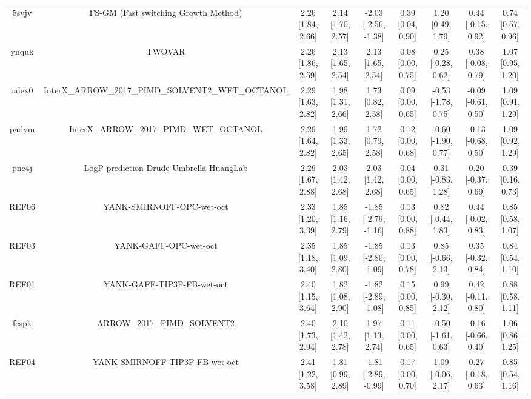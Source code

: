 \documentclass{article}
\begin{document}
\begin{center}
\begin{longtable}{|ccccccccc|}
 5svjv &               FS-GM (Fast switching Growth Method) &  2.26 [1.84, 2.66] &  2.14 [1.70, 2.57] &  -2.03 [-2.56, -1.38] &  0.39 [0.04, 0.90] &    1.20 [0.49, 1.79] &   0.44 [-0.15, 0.92] &     0.74 [0.57, 0.96] \\
 ynquk &                                             TWOVAR &  2.26 [1.86, 2.59] &  2.13 [1.65, 2.54] &     2.13 [1.65, 2.54] &  0.08 [0.00, 0.75] &   0.25 [-0.28, 0.62] &   0.38 [-0.08, 0.79] &     1.07 [0.95, 1.20] \\
 odex0 &  InterX\_ARROW\_2017\_PIMD\_SOLVENT2\_WET\_OCTANOL &  2.29 [1.63, 2.82] &  1.98 [1.31, 2.66] &     1.73 [0.82, 2.58] &  0.09 [0.00, 0.65] &  -0.53 [-1.78, 0.75] &  -0.09 [-0.61, 0.50] &     1.09 [0.91, 1.29] \\
 padym &            InterX\_ARROW\_2017\_PIMD\_WET\_OCTANOL &  2.29 [1.64, 2.82] &  1.99 [1.33, 2.65] &     1.72 [0.79, 2.58] &  0.12 [0.00, 0.68] &  -0.60 [-1.90, 0.77] &  -0.13 [-0.68, 0.50] &     1.09 [0.92, 1.29] \\
 pnc4j &            LogP-prediction-Drude-Umbrella-HuangLab &  2.29 [1.67, 2.88] &  2.03 [1.42, 2.68] &     2.03 [1.42, 2.68] &  0.04 [0.00, 0.65] &   0.31 [-0.83, 1.28] &   0.20 [-0.37, 0.69] &     0.39 [0.16, 0.73] \\
 REF06 &                          YANK-SMIRNOFF-OPC-wet-oct &  2.33 [1.20, 3.39] &  1.85 [1.16, 2.79] &  -1.85 [-2.79, -1.16] &  0.13 [0.00, 0.88] &   0.82 [-0.44, 1.83] &   0.44 [-0.02, 0.83] &     0.85 [0.58, 1.07] \\
 REF03 &                              YANK-GAFF-OPC-wet-oct &  2.35 [1.18, 3.40] &  1.85 [1.09, 2.80] &  -1.85 [-2.80, -1.09] &  0.13 [0.00, 0.78] &   0.85 [-0.66, 2.13] &   0.35 [-0.32, 0.84] &     0.84 [0.54, 1.10] \\
 REF01 &                         YANK-GAFF-TIP3P-FB-wet-oct &  2.40 [1.15, 3.64] &  1.82 [1.08, 2.90] &  -1.82 [-2.89, -1.08] &  0.15 [0.00, 0.85] &   0.99 [-0.30, 2.12] &   0.42 [-0.11, 0.80] &     0.88 [0.58, 1.11] \\
 fcspk &                        ARROW\_2017\_PIMD\_SOLVENT2 &  2.40 [1.73, 2.94] &  2.10 [1.42, 2.78] &     1.97 [1.13, 2.74] &  0.11 [0.00, 0.65] &  -0.50 [-1.61, 0.63] &  -0.16 [-0.66, 0.40] &     1.06 [0.86, 1.25] \\
 REF04 &                     YANK-SMIRNOFF-TIP3P-FB-wet-oct &  2.41 [1.22, 3.58] &  1.81 [0.99, 2.89] &  -1.81 [-2.89, -0.99] &  0.17 [0.00, 0.70] &   1.09 [-0.06, 2.17] &   0.27 [-0.18, 0.63] &     0.85 [0.54, 1.16] \\

\end{longtable}
\end{center}
\end{document}

